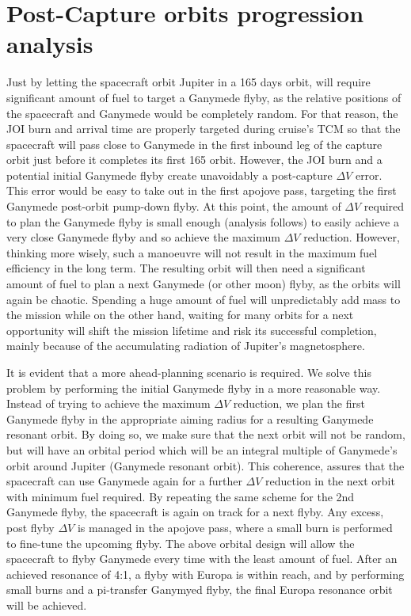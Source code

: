 \section{Post-Capture orbits progression analysis}
Just by letting the spacecraft orbit Jupiter in a 165 days orbit, will require significant amount of fuel to target a Ganymede flyby, as the relative positions of the spacecraft and Ganymede would be completely random. For that reason, the JOI burn and arrival time are properly targeted during cruise's TCM so that the spacecraft will pass close to Ganymede in the first inbound leg of the capture orbit just before it completes its first 165 orbit. However, the JOI burn and a potential initial Ganymede flyby create unavoidably a post-capture $\Delta V$ error. This  error would be easy to take out in the first apojove pass, targeting the first Ganymede post-orbit pump-down flyby. At this point, the amount of $\Delta V$ required to plan the Ganymede flyby is small enough (analysis follows) to easily achieve a very close Ganymede flyby and so achieve the maximum $\Delta V$ reduction. However, thinking more wisely, such a manoeuvre will not result in the maximum fuel efficiency in the long term. The resulting orbit will then need a significant amount of fuel to plan a next Ganymede (or other moon) flyby, as the orbits will again be chaotic. Spending a huge amount of fuel will unpredictably add mass to the mission while on the other hand, waiting for many orbits for a next opportunity will shift the mission lifetime and risk its successful completion, mainly because of the accumulating radiation of Jupiter's magnetosphere.

It is evident that a more ahead-planning scenario is required. We solve this problem by performing the initial Ganymede flyby in a more reasonable way. Instead of trying to achieve the maximum $\Delta V$ reduction, we plan the first Ganymede flyby in the appropriate aiming radius for a resulting Ganymede resonant orbit. By doing so, we make sure that the next orbit will not be random, but will have an orbital period which will be an integral multiple of Ganymede's orbit around Jupiter (Ganymede resonant orbit). This coherence, assures that the spacecraft can use Ganymede again for a further $\Delta V$ reduction in the next orbit with minimum fuel required. By repeating the same scheme for the 2nd Ganymede flyby, the spacecraft is again on track for a next flyby. Any excess, post flyby $\Delta V$ is managed in the apojove pass, where a small burn is performed to fine-tune the upcoming flyby. The above orbital design will allow the spacecraft to flyby Ganymede every time with the least amount of fuel. After an achieved resonance of 4:1, a flyby with Europa is within reach, and by performing small burns and a pi-transfer Ganymyed flyby, the final Europa resonance orbit will be achieved. 
\newpage
